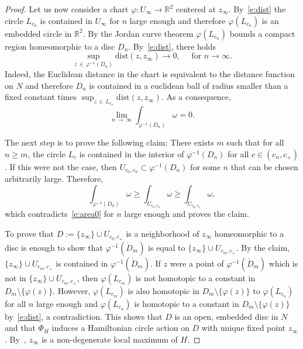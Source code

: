 \documentclass[10pt]{amsart}
\theoremstyle{definition}
\newcommand{\R}{\mathbb{R}}
\newcommand{\dist}{\mathrm{dist}}
\begin{document}
\begin{proof}
Let us now consider a chart $\varphi:U_\infty\to\R^2$ centered at $z_\infty$. By~\eqref{e:dist} the circle $L_{c_n}$ is contained in $U_\infty$ for $n$ large enough and therefore $\varphi(L_{c_n})$ is an embedded circle in $\R^2$. By the Jordan curve theorem $\varphi(L_{c_n})$ bounds a compact region homeomorphic to a disc $D_n$. By~\eqref{e:dist}, there holds
\begin{equation}\label{e:dist0}
\sup_{z\,\in\,\varphi^{-1}(D_n)}\dist\left(z,z_\infty\right)\to0,\quad \text{ for }n\to\infty.
\end{equation}
Indeed, the Euclidean distance in the chart is equivalent to the distance function on $N$ and therefore $D_n$ is contained in a euclidean ball of radius smaller than a fixed constant times $\sup_{z\,\in\,L_{c_n}}\dist(z,z_\infty)$. As a consequence,
\begin{equation}\label{e:area0}
\lim_{n\,\to\,\infty}\int_{\varphi^{-1}(D_n)}\omega=0.
\end{equation}

The next step is to prove the following claim: There exists $m$ such that for all $n\geq m$, the circle $L_c$ is contained in the interior of $\varphi^{-1}(D_n)$ for all $c\in(c_n,c_+)$. If this were not the case, then $U_{c_0,c_n}\subset\varphi^{-1}(D_n)$ for some $n$ that can be chosen arbitrarily large. Therefore,
\[
\int_{\varphi^{-1}\left(D_n\right)}\omega\geq \int_{U_{c_0,c_n}}\omega\geq \int_{U_{c_0,c_1}}\omega,
\]
which contradicts~\eqref{e:area0} for $n$ large enough and proves the claim.

To prove that $D:=\{z_\infty\}\cup U_{c_0,c_+}$ is a neighborhood of $z_\infty$ homeomorphic to a disc is enough to show that $\varphi^{-1}(\mathring D_m)$ is equal to $\{z_\infty\}\cup U_{c_m,c_+}$. By the claim, $\{z_\infty\}\cup U_{c_m,c_+}$ is contained in $\varphi^{-1}(\mathring D_m)$. If $z$ were a point of $\varphi^{-1}(\mathring D_m)$ which is not in $\{z_\infty\}\cup U_{c_m,c_+}$, then $\varphi(L_{c_m})$ is not homotopic to a constant in $D_m\setminus\{\varphi(z)\}$. However, $\varphi(L_{c_m})$ is also homotopic in $D_m\setminus\{\varphi(z)\}$ to $\varphi(L_{c_n})$ for all $n$ large enough and $\varphi(L_{c_n})$ is homotopic to a constant in $D_m\setminus\{\varphi(z)\}$ by~\eqref{e:dist}, a contradiction. This shows that $D$ is an open, embedded disc in $N$ and that $\Phi_H$ induces a Hamiltonian circle action on $D$ with unique fixed point $z_\infty$. By~\cite[Lemma~5.5.8]{McDuff:1998uu}, $z_\infty$ is a non-degenerate local maximum of $H$.
\end{proof}
\end{document}
